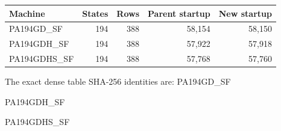 \begin{center}
\begin{tabular}{@{}lrrrr@{}}
\toprule
Machine & States & Rows & Parent startup & New startup\\\midrule
PA194GD\_SF & 194 & 388 & 58,154 & 58,150\\
PA194GDH\_SF & 194 & 388 & 57,922 & 57,918\\
PA194GDHS\_SF & 194 & 388 & 57,768 & 57,760\\
\bottomrule
\end{tabular}
\end{center}
The exact dense table SHA-256 identities are:
PA194GD\_SF\par{\small{}}\par
PA194GDH\_SF\par{\small{}}\par
PA194GDHS\_SF\par{\small{}}\par
